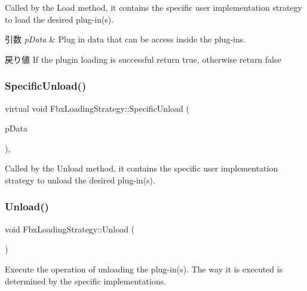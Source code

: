 Called by the Load method, it contains the specific user implementation strategy to load the desired plug-\/in(s). 
\begin{DoxyParams}{引数}
{\em p\+Data} & Plug in data that can be access inside the plug-\/ins. \\
\hline
\end{DoxyParams}
\begin{DoxyReturn}{戻り値}
If the plugin loading is successful return {\ttfamily true}, otherwise return {\ttfamily false} 
\end{DoxyReturn}
\mbox{\label{class_fbx_loading_strategy_a22f41510c2741f68ffb96f7c3da79a85}} 
\subsubsection{\texorpdfstring{Specific\+Unload()}{SpecificUnload()}}
{\footnotesize\ttfamily virtual void Fbx\+Loading\+Strategy\+::\+Specific\+Unload (\begin{DoxyParamCaption}\item[{\hyperlink{struct_fbx_plugin_data}{Fbx\+Plugin\+Data} \&}]{p\+Data }\end{DoxyParamCaption})\hspace{0.3cm}{\ttfamily [protected]}, {}}

Called by the Unload method, it contains the specific user implementation strategy to unload the desired plug-\/in(s). \mbox{\label{class_fbx_loading_strategy_a53e5398383c4b2df2c8047c7d0d20581}} 
\subsubsection{\texorpdfstring{Unload()}{Unload()}}
{\footnotesize\ttfamily void Fbx\+Loading\+Strategy\+::\+Unload (\begin{DoxyParamCaption}{ }\end{DoxyParamCaption})}

Execute the operation of unloading the plug-\/in(s). The way it is executed is determined by the specific implementations. 


